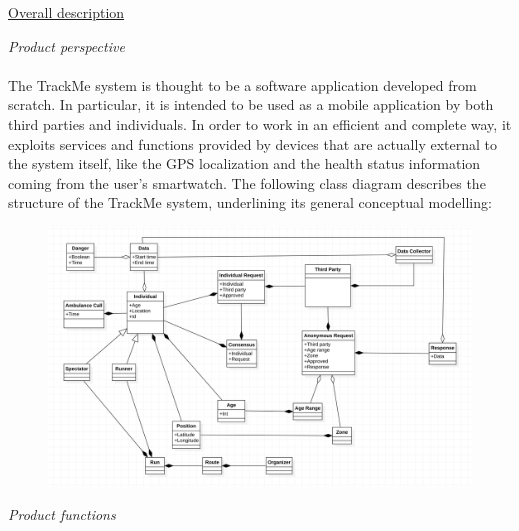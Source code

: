 \documentclass{article}
\begin{document}
\begin{legal}
  	\item \underline{Overall description}
  		\begin{legal}
    		\item \textit{Product perspective}\\\\
			{\normalfont
The TrackMe system is thought to be a software application developed from scratch. In particular, it is intended to be used as a mobile application by both third parties and individuals.
In order to work in an efficient and complete way, it exploits services and functions provided by devices that are actually external to the system itself, like the GPS 				localization and the health status information coming from the user’s smartwatch.
The following class diagram describes the structure of the TrackMe system, underlining its general conceptual modelling:
			}
			\begin{figure}[H]
  			\includegraphics[width=\linewidth]{./images/UML1-0.png}
			\end{figure}
		\item \textit{Product functions} \\
		{\normalfont
		
}
\end{legal}
\end{legal}
\end{document}
